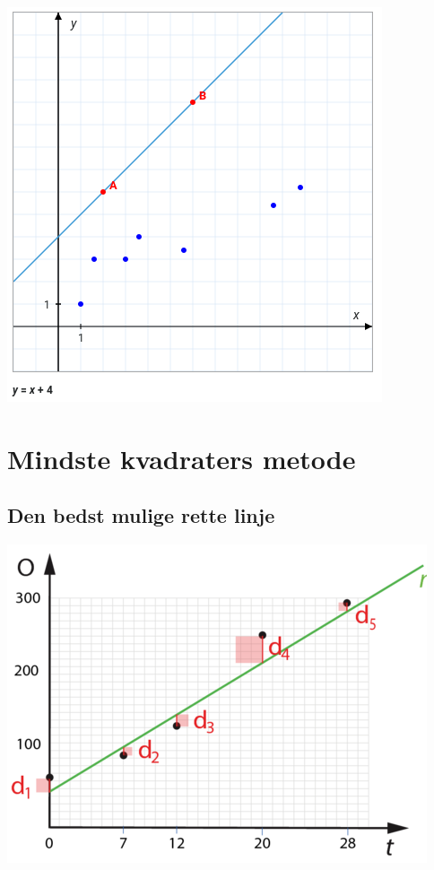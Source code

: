 \documentclass[11pt]{article}
\begin{document}
\begin{center}
\includegraphics[width=.9\linewidth]{img/screenshot_2019-09-05_09-54-19.png}
\end{center}

\section*{Mindste kvadraters metode}
\label{sec:org449302c}

\subsection*{Den bedst mulige rette linje}
\label{sec:org7e42469}

\begin{center}
\includegraphics[width=.9\linewidth]{img/screenshot_2019-09-05_10-23-36.png}
\end{center}
\end{document}
